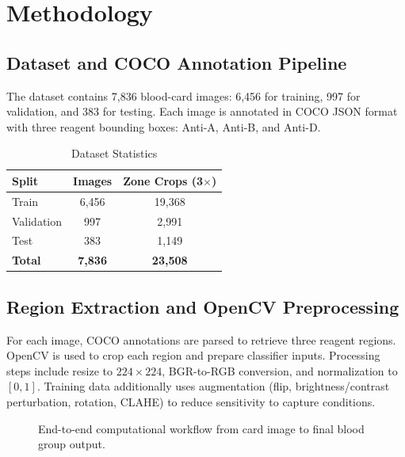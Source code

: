 \documentclass[conference]{IEEEtran}
\begin{document}
\section{Methodology}
\subsection{Dataset and COCO Annotation Pipeline}
The dataset contains 7,836 blood-card images: 6,456 for training, 997 for validation, and 383 for testing. Each image is annotated in COCO JSON format with three reagent bounding boxes: Anti-A, Anti-B, and Anti-D.

\begin{table}[htbp]
  \caption{Dataset Statistics}
  \label{tab:dataset}
  \centering
  \begin{tabular}{lcc}
    \toprule
    \textbf{Split} & \textbf{Images} & \textbf{Zone Crops (3$\times$)} \\
    \midrule
    Train & 6,456 & 19,368 \\
    Validation & 997 & 2,991 \\
    Test & 383 & 1,149 \\
    \midrule
    \textbf{Total} & \textbf{7,836} & \textbf{23,508} \\
    \bottomrule
  \end{tabular}
\end{table}

\subsection{Region Extraction and OpenCV Preprocessing}
For each image, COCO annotations are parsed to retrieve three reagent regions. OpenCV is used to crop each region and prepare classifier inputs. Processing steps include resize to $224\times224$, BGR-to-RGB conversion, and normalization to $[0,1]$. Training data additionally uses augmentation (flip, brightness/contrast perturbation, rotation, CLAHE) to reduce sensitivity to capture conditions.

\begin{figure}[htbp]
  \centering
  \caption{End-to-end computational workflow from card image to final blood group output.}
  \label{fig:workflow}
\end{figure}
\end{document}
